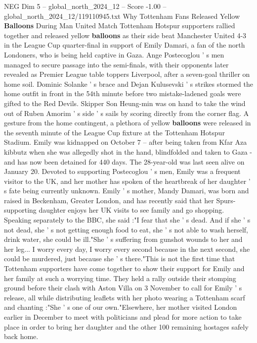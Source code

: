 \begin{textsample}{NEG Dim 5 – global\_north\_2024\_12 – Score -1.00 – global\_north\_2024\_12/119110945.txt}  \label{ex:f5_neg_332}
Why Tottenham Fans Released Yellow \textbf{Balloons} During Man United Match Tottenham Hotspur supporters rallied together and released yellow \textbf{balloons} as their side beat Manchester United 4-3 in the League Cup quarter-final in support of Emily Damari, a fan of the north Londoners, who is being held captive in Gaza.
Ange Postecoglou ' s men managed to secure passage into the semi-finals, with their opponents later revealed as Premier League table toppers Liverpool, after a seven-goal thriller on home soil.
Dominic Solanke ' s brace and Dejan Kulusevski ' s strikes stormed the home outfit in front in the 54th minute before two mistake-ladened goals were gifted to the Red Devils.
Skipper Son Heung-min was on hand to take the wind out of Ruben Amorim ' s side ' s sails by scoring directly from the corner flag.
A gesture from the home contingent, a plethora of yellow \textbf{balloons} were released in the seventh minute of the League Cup fixture at the Tottenham Hotspur Stadium.
Emily was kidnapped on October 7 -- after being taken from Kfar Aza kibbutz when she was allegedly shot in the hand, blindfolded and taken to Gaza - and has now been detained for 440 days.
The 28-year-old was last seen alive on January 20.
Devoted to supporting Postecoglou ' s men, Emily was a frequent visitor to the UK, and her mother has spoken of the heartbreak of her daughter ' s fate being currently unknown.
Emily ' s mother, Mandy Damari, was born and raised in Beckenham, Greater London, and has recently said that her Spurs-supporting daughter enjoys her UK visits to see family and go shopping.
Speaking separately to the BBC, she said :"I fear that she ' s dead.
And if she ' s not dead, she ' s not getting enough food to eat, she ' s not able to wash herself, drink water, she could be ill."She ' s suffering from gunshot wounds to her and her leg...
I worry every day, I worry every second because in the next second, she could be murdered, just because she ' s there."This is not the first time that Tottenham supporters have come together to show their support for Emily and her family at such a worrying time.
They held a rally outside their stomping ground before their clash with Aston Villa on 3 November to call for Emily ' s release, all while distributing leaflets with her photo wearing a Tottenham scarf and chanting :"She ' s one of our own."Elsewhere, her mother visited London earlier in December to meet with politicians and plead for more action to take place in order to bring her daughter and the other 100 remaining hostages safely back home.

\end{textsample}
